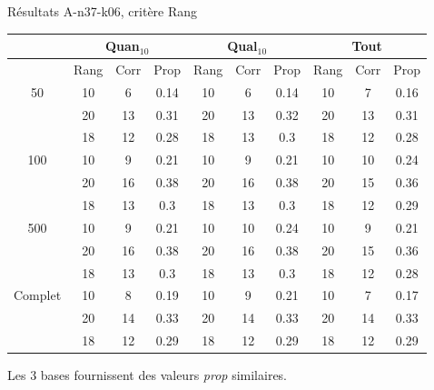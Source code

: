 \documentclass{beamer}
\begin{document}
\begin{frame}{Résultats A-n37-k06, critère Rang}
\begin{table}[H]

\begin{tabular}{|@{}c@{}|@{}c@{}|@{}c@{}|@{}c@{}||@{}c@{}|@{}c@{}|@{}c@{}||@{}c@{}|@{}c@{}|@{}c@{}|}

\hline
 & \multicolumn{3}{c|}{Quan$_{10}$} & \multicolumn{3}{c|}{Qual$_{10}$} & \multicolumn{3}{c|}{Tout} \\
 \hline
 & Rang & Corr & Prop & Rang & Corr & Prop & Rang & Corr & Prop \\
 \hline
 50 & 10  & 6 & 0.14 & 10  & 6 & 0.14 & 10  & 7 & 0.16  \\
 \cline{2-10} 
    & 20 & 13 & 0.31 & 20  & 13 & 0.32 & 20  & 13 & 0.31  \\
 \cline{2-10} 
    & 18 & 12 & 0.28 & 18 & 13 & 0.3 & 18 & 12 & 0.28  \\
  \hline
   100 & 10  & 9 & 0.21 & 10  & 9 & 0.21 & 10  & 10 & 0.24  \\
 \cline{2-10} 
    & 20 & 16 & 0.38 & 20 & 16 & 0.38 & 20 & 15 & 0.36  \\
  \cline{2-10} 
    & 18 & 13 & 0.3 & 18 & 13 & 0.3 & 18 & 12 & 0.29  \\
  \hline
   500 & 10  & 9 & 0.21 & 10  & 10 & 0.24 & 10  & 9 & 0.21  \\
 \cline{2-10} 
    & 20 & 16 & 0.38 & 20 & 16 & 0.38 & 20 & 15 & 0.36  \\
  \cline{2-10} 
    & 18 & 13 & 0.3 & 18 & 13 & 0.3 & 18 & 12 & 0.28  \\
  \hline
   Complet & 10 & 8 & 0.19 & 10 & 9 & 0.21 & 10 & 7 & 0.17  \\
 \cline{2-10} 
    & 20 & 14 & 0.33 & 20 & 14 & 0.33 & 20 & 14 & 0.33  \\
  \cline{2-10} 
    & 18 & 12 & 0.29 & 18 & 12 & 0.29 & 18 & 12 & 0.29  \\
  \hline

\end{tabular}
\end{table}

Les 3 bases fournissent des valeurs \emph{prop} similaires.


\end{frame}
\end{document}
